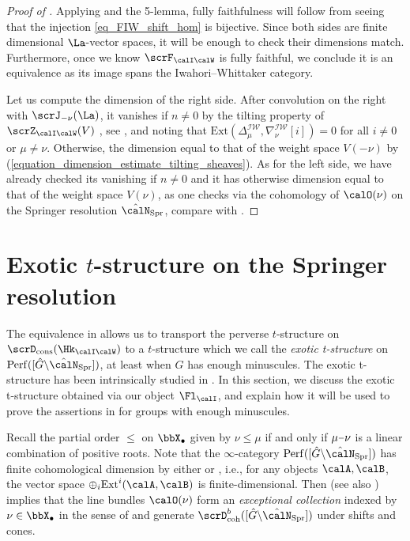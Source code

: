 \documentclass[10pt, reqno]{amsart}
\theoremstyle{plain}
\theoremstyle{definition}
\newcommand{\minus}{\scalebox{0.75}[1.0]{$-$}}
\numberwithin{equation}{section}
\begin{document}
\begin{proof}[Proof of ]
	Applying \cite[Lemma 6.2.8.(2)]{AR} and the 5-lemma, fully faithfulness will follow from seeing that the injection \eqref{eq_FIW_shift_hom} is bijective. Since both sides are finite dimensional $\La$-vector spaces, it will be enough to check their dimensions match. Furthermore, once we know $\scrF_{\calI\calW}$ is fully faithful, we conclude it is an equivalence as its image spans the Iwahori--Whittaker category.
	
	Let us compute the dimension of the right side. After convolution on the right with $\scrJ_{-\nu}(\La)$, it vanishes if $n \neq 0$ by the tilting property of $\scrZ_{\calI\calW}(V)$ , see , and noting that $\mathrm{Ext}(\Delta^{\mathcal{IW}}_\mu,\nabla^\mathcal{IW}_\nu[i])=0$ for all $i\neq 0$ or $\mu\neq \nu$.  Otherwise, the dimension equal to that of the weight space $V(-\nu)$ by (\ref{equation_dimension_estimate_tilting_sheaves}). As for the left side, we have already checked its vanishing if $n\neq 0$ and it has otherwise dimension equal to that of the weight space $V(\nu)$, as one checks via the cohomology of $\calO(\nu)$ on the Springer resolution $\hat{\calN}_{\mathrm{Spr}}$, compare with \cite[Subsection 6.6.3]{AR}.
\end{proof}



\section{Exotic $t$-structure on the Springer resolution}
The equivalence in  allows us to transport the perverse $t$-structure on $\scrD_{\mathrm{cons}}(\Hk_{\calI\calW})$ to a $t$-structure which we call the \textit{exotic t-structure} on $\mathrm{Perf}([\hat{G}\backslash \hat{\calN}_{\mathrm{Spr}}])$, at least when $G$ has enough minuscules. The exotic t-structure has been intrinsically studied in \cite{Bez06,MR16}. In this section, we discuss the exotic t-structure obtained via our object $\Fl_\calI$, and explain how it will be used to prove the assertions in  for groups with enough minuscules.

Recall the partial order $\leq $ on $\bbX_{\bullet}$ given by $\nu\leq \mu$ if and only if $\mu\minus \nu$ is a linear combination of positive roots. Note that the $\infty$-category $\mathrm{Perf}([\hat{G}\backslash \hat{\calN}_{\mathrm{Spr}}])$ has finite cohomological dimension by either \cite[Corollary 3.2.2]{BGS96} or \cite[Theorem 1.4.2]{DG13}, i.e., for any objects $\calA,\calB$, the vector space $\oplus_i\mathrm{Ext}^i(\calA,\calB)$ is finite-dimensional. Then \cite[Lemma 7.1.2]{AR} (see also \cite[Lemma 5]{Bez06}) implies that the line bundles $\calO(\nu)$ form an \textit{exceptional collection} indexed by $\nu \in \bbX_\bullet$ in the sense of \cite[Section 2.1.2]{Bez06} and generate $\scrD^b_{\mathrm{coh}}([\hat{G}\backslash \hat{\calN}_{\mathrm{Spr}}])$ under shifts and cones.
\end{document}
